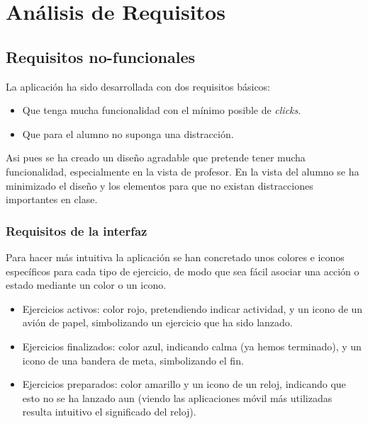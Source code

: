 
\chapter{Análisis de Requisitos}
\label{analisis-de-requisitos}

\section{Requisitos no-funcionales}
\label{analisis-de-requisitos:no-funcionales}

La aplicación ha sido desarrollada con dos requisitos básicos:

\begin{itemize}
\item Que tenga mucha funcionalidad con el mínimo posible de \textit{clicks}.
\item Que para el alumno no suponga una distracción.
\end{itemize}

Asi pues se ha creado un diseño agradable que pretende tener mucha funcionalidad, especialmente en la vista de profesor. En la vista del alumno se ha minimizado el diseño y los elementos para que no existan distracciones importantes en clase.\\

\subsection{Requisitos de la interfaz}
\label{analisis-de-requisitos:no-funcionales:interfaz}

Para hacer más intuitiva la aplicación se han concretado unos colores e iconos específicos para cada tipo de ejercicio, de modo que sea fácil asociar una acción o estado mediante un color o un icono.

\begin{itemize}
\item Ejercicios activos: color rojo, pretendiendo indicar actividad, y un icono de un avión de papel, simbolizando un ejercicio que ha sido lanzado.
\item Ejercicios finalizados: color azul, indicando calma (ya hemos terminado), y un icono de una bandera de meta, simbolizando el fin.
\item Ejercicios preparados: color amarillo y un icono de un reloj, indicando que esto no se ha lanzado aun (viendo las aplicaciones móvil más utilizadas resulta intuitivo el significado del reloj).
\end{itemize}

